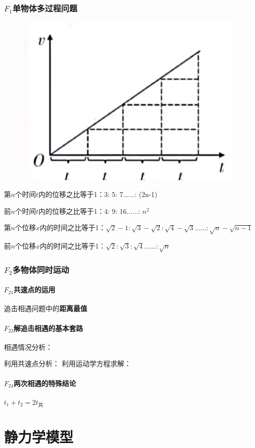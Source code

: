 \documentclass[lang=cn,10pt]{elegantbook}
\begin{document}
	\subsection{$F_1$单物体多过程问题}
	\begin{figure}[H]
		\centering
		\includegraphics[width=0.35\linewidth]{image/10}
	\end{figure}
	\vspace{1cm}
	\begin{note}
		第$n$个时间$t$内的位移之比等于1：3: 5: 7......: (2n-1)
		
		前$n$个时间$t$内的位移之比等于1：4: 9: 16......: $n^2$
		
		第$n$个位移$x$内的时间之比等于1：$\sqrt2-1:\sqrt{3}-\sqrt2:\sqrt{4}-\sqrt3......:\sqrt{n}-\sqrt{n-1}$
		
		前$n$个位移$x$内的时间之比等于1：$\sqrt2:\sqrt{3}:\sqrt{4}......:\sqrt{n}$
	\end{note}
	\subsection{$F_2$多物体同时运动}
	\subsubsection{$F_{21}$共速点的运用}
	追击相遇问题中的\textbf{距离最值}
	\vspace{2.5cm}
	\subsubsection{$F_{22}$解追击相遇的基本套路}
	相遇情况分析：
	
	\vspace{3cm}
	利用共速点分析：
	\vspace{3cm}
	利用运动学方程求解：
	\vspace{3cm}
	\subsubsection{$F_{24}$两次相遇的特殊结论}
	$t_{1}+t_{2}=2t_{\text{共}}$
	\chapter{静力学模型}
\end{document}
